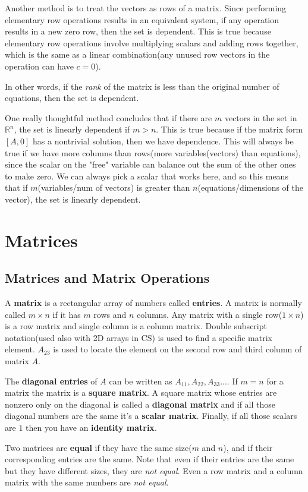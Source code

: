 \documentclass{article}
\begin{document}
Another method is to treat the vectors as rows of a matrix. Since performing elementary row operations results in an equivalent system, if any operation results in a new zero row, then the set is dependent. This is true because elementary row operations involve multiplying scalars and adding rows together, which is the same as a linear combination(any unused row vectors in the operation can have $c = 0$).

In other words, if the \textit{rank} of the matrix is less than the original number of equations, then the set is dependent.

One really thoughtful method concludes that if there are $m$ vectors in the set in $\mathbb{R}^n$, the set is linearly dependent if $m > n$. This is true because if the matrix form $[A,0]$ has a nontrivial solution, then we have dependence. This will always be true if we have more columns than rows(more variables(vectors) than equations), since the scalar on the "free" variable can balance out the sum of the other ones to make zero. We can always pick a scalar that works here, and so this means that if $m$(variables/num of vectors) is greater than $n$(equations/dimensions of the vector), the set is linearly dependent.
\section{Matrices}
\subsection{Matrices and Matrix Operations}
A \textbf{matrix} is a rectangular array of numbers called \textbf{entries}. A matrix is normally called $m \times n$ if it has $m$ rows and $n$ columns. Any matrix with a single row($1 \times n$) is a row matrix and single column is a column matrix. Double subscript notation(used also with 2D arrays in CS) is used to find a specific matrix element. $A_{23}$ is used to locate the element on the second row and third column of matrix $A$.

The \textbf{diagonal entries} of $A$ can be written as $A_{11}, A_{22},A_{33}...$. If $m = n$ for a matrix the matrix is a \textbf{square matrix}. A square matrix whose entries are nonzero only on the diagonal is called a \textbf{diagonal matrix} and if all those diagonal numbers are the same it's a \textbf{scalar matrix}. Finally, if all those scalars are $1$ then you have an \textbf{identity matrix}.

Two matrices are \textbf{equal} if they have the same size($m$ and $n$), and if their corresponding entries are the same. Note that even if their entries are the same but they have different sizes, they are \textit{not equal}. Even a row matrix and a column matrix with the same numbers are \textit{not equal}.
\end{document}
